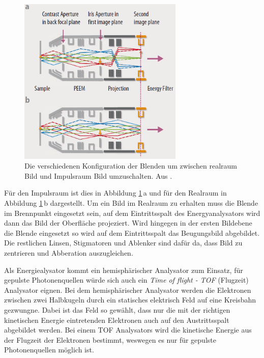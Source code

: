         \begin{figure}
            \centering
            \includegraphics[width=0.7\textwidth]{./content/Real_k.PNG}
            \caption{Die verschiedenen Konfiguration der Blenden um zwischen realraum Bild und Impulsraum Bild umzuschalten. Aus \cite{Focus}.}
            \label{fig:real_k}
        \end{figure}
        Für den Impulsraum ist dies in Abbildung \ref{fig:real_k}\,a und für den Realraum in Abbildung \ref{fig:real_k}\,b dargestellt.
        Um ein Bild im Realraum zu erhalten muss die Blende im Brennpunkt eingesetzt sein, auf dem Eintrittsspalt des Energyanalysators wird dann das Bild der Oberfläche projeziert.
        Wird hingegen in der ersten Bildebene die Blende eingesetzt so wird auf dem Eintrittsspalt das Beugungsbild abgebildet. 
        Die restlichen Linsen, Stigmatoren und Ablenker sind dafür da, dass Bild zu zentrieren und Abberation auszugleichen.

        Als Energiealysator kommt ein hemisphärischer Analysator zum Einsatz, für gepulste Photonenquellen würde sich auch ein \textit{Time of flight - TOF} (Flugzeit) Analysator eignen.
        Bei dem hemisphärischer Analysator werden die Elektronen zwischen zwei Halbkugeln durch ein statisches elektrisch Feld auf eine Kreisbahn gezwungne.
        Dabei ist das Feld so gewählt, dass nur die mit der richtigen kinetischen Energie eintretenden Elektronen auch auf den Austrittsspalt abgebildet werden.
        Bei einem TOF Analysators wird die kinetische Energie aus der Flugzeit der Elektronen bestimmt, weswegen es nur für gepulste Photonenquellen möglich ist.

